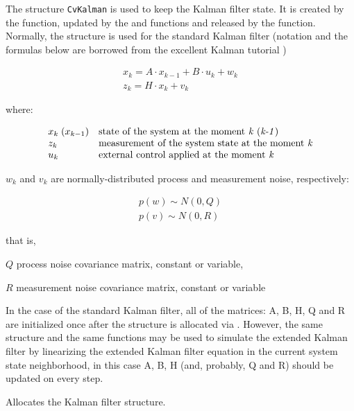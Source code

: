 The structure \texttt{CvKalman} is used to keep the Kalman filter
state. It is created by the  function, updated
by the  and  functions
and released by the  function. Normally, the
structure is used for the standard Kalman filter (notation and the
formulas below are borrowed from the excellent Kalman tutorial
\cite{Welch95})

\[
\begin{array}{l}
x_k=A \cdot x_{k-1}+B \cdot u_k+w_k\\
z_k=H \cdot x_k+v_k
\end{array}
\]

where:

\[
\begin{array}{l l}
x_k\;(x_{k-1})& \text{state of the system at the moment \emph{k} (\emph{k-1})}\\
z_k & \text{measurement of the system state at the moment \emph{k}}\\
u_k & \text{external control applied at the moment \emph{k}}
\end{array}
\]

$w_k$ and $v_k$ are normally-distributed process and measurement noise, respectively:

\[
\begin{array}{l}
p(w) \sim N(0,Q)\\
p(v) \sim N(0,R)
\end{array}
\]

that is,

$Q$ process noise covariance matrix, constant or variable,

$R$ measurement noise covariance matrix, constant or variable

In the case of the standard Kalman filter, all of the matrices: A, B, H, Q and R are initialized once after the  structure is allocated via . However, the same structure and the same functions may be used to simulate the extended Kalman filter by linearizing the extended Kalman filter equation in the current system state neighborhood, in this case A, B, H (and, probably, Q and R) should be updated on every step.

Allocates the Kalman filter structure.


